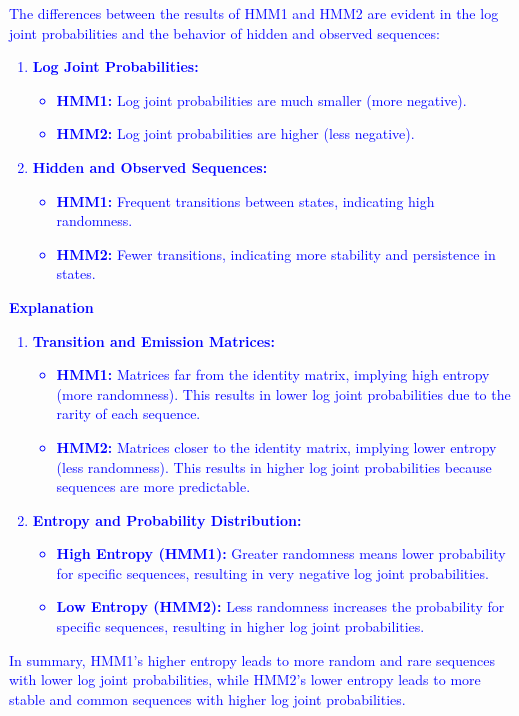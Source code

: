 \documentclass[a4 paper]{article}
\begin{document}
\begin{enumerate}
    \textcolor{blue}{
        The differences between the results of HMM1 and HMM2 are evident in the log joint probabilities and the behavior of hidden and observed sequences: \\
        \begin{enumerate}
            \item \textbf{Log Joint Probabilities:}
            \begin{itemize}
                \item \textbf{HMM1:} Log joint probabilities are much smaller (more negative).
                \item \textbf{HMM2:} Log joint probabilities are higher (less negative).
            \end{itemize}
            \item \textbf{Hidden and Observed Sequences:}
            \begin{itemize}
                \item \textbf{HMM1:} Frequent transitions between states, indicating high randomness.
                \item \textbf{HMM2:} Fewer transitions, indicating more stability and persistence in states.
            \end{itemize}
        \end{enumerate}
        \textbf{Explanation}
        \begin{enumerate}
            \item \textbf{Transition and Emission Matrices:}
            \begin{itemize}
                \item \textbf{HMM1:} Matrices far from the identity matrix, implying high entropy (more randomness). This results in lower log joint probabilities due to the rarity of each sequence.
                \item \textbf{HMM2:} Matrices closer to the identity matrix, implying lower entropy (less randomness). This results in higher log joint probabilities because sequences are more predictable.
            \end{itemize}
            \item \textbf{Entropy and Probability Distribution:}
            \begin{itemize}
                \item \textbf{High Entropy (HMM1):} Greater randomness means lower probability for specific sequences, resulting in very negative log joint probabilities.
                \item \textbf{Low Entropy (HMM2):} Less randomness increases the probability for specific sequences, resulting in higher log joint probabilities.
            \end{itemize}
        \end{enumerate}
        In summary, HMM1’s higher entropy leads to more random and rare sequences with lower log joint probabilities, while HMM2’s lower entropy leads to 
        more stable and common sequences with higher log joint probabilities.
    }
    \\


\end{enumerate}
\end{document}
